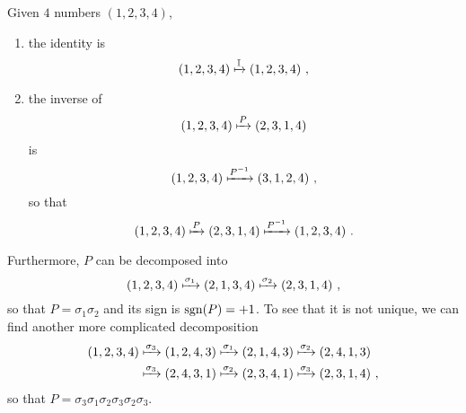     \begin{example}
        Given $4$ numbers $(1,2,3,4)$, 
        \begin{enumerate}
            \item the identity is 
                \begin{equation*}
                    (1,2,3,4) \xmapsto{\mathbb I} (1,2,3,4) ~,
                \end{equation*}
            \item the inverse of  
                \begin{equation*}
                    (1,2,3,4) \xmapsto{P} (2,3,1,4) 
                \end{equation*}
                is 
                \begin{equation*}
                    (1,2,3,4) \xmapsto{P^{-1}} (3,1,2,4) ~,
                \end{equation*}
                so that 
                \begin{equation*}
                    (1,2,3,4) \xmapsto{P} (2,3,1,4) \xmapsto{P^{-1}} (1,2,3,4) ~.
                \end{equation*}
        \end{enumerate}
        Furthermore, $P$ can be decomposed into  
        \begin{equation*}
            (1,2,3,4) \xmapsto{\sigma_1} (2,1,3,4) \xmapsto{\sigma_2} (2,3,1,4) ~,
        \end{equation*}
        so that $P = \sigma_1 \sigma_2$ and its sign is $\operatorname{sgn}(P) = +1$. To see that it is not unique, we can find another more complicated decomposition 
        \begin{equation*}
        \begin{aligned}
            (1,2,3,4) & \xmapsto{\sigma_3} (1,2,4,3) \xmapsto{\sigma_1} (2,1,4,3) \xmapsto{\sigma_2} (2,4,1,3) \\ & \xmapsto{\sigma_3} (2,4,3,1) \xmapsto{\sigma_2} (2,3,4,1) \xmapsto{\sigma_3} (2,3,1,4)  ~,
        \end{aligned}
        \end{equation*}
        so that $P = \sigma_3 \sigma_1 \sigma_2 \sigma_3 \sigma_2 \sigma_3$.
    \end{example}

